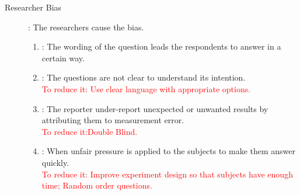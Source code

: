 \begin{description}
       \item[Researcher Bias]: The researchers cause the bias.
       \begin{enumerate}
   
            \item {} : The wording of the question leads the respondents to answer in a certain way.
            \item {} : The questions are not clear to understand its intention.\\ \textcolor{red}{To reduce it: Use clear language with appropriate options.}
            \item {} : The reporter under-report unexpected or unwanted results by attributing them to measurement error.\\ \textcolor{red}{To reduce it:Double Blind.}
            \item {} : When unfair pressure is applied to the subjects to make them answer quickly.\\ \textcolor{red}{To reduce it: Improve experiment design so that subjects have enough time; Random order questions.}
       \end{enumerate}
    \end{description}
\
